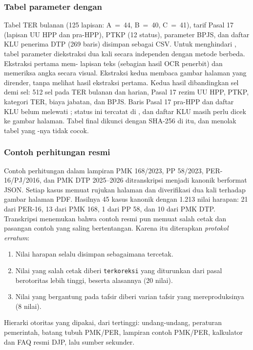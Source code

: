 \subsubsection{Tabel parameter dengan }
Tabel TER bulanan (125 lapisan: A~=~44, B~=~40, C~=~41), tarif Pasal 17 (lapisan UU HPP dan pra-HPP), PTKP (12 status), parameter BPJS, dan daftar KLU penerima DTP (269 baris) disimpan sebagai CSV. Untuk menghindari , tabel parameter diekstraksi dua kali secara independen dengan metode berbeda. Ekstraksi pertama mem- lapisan teks (sebagian hasil OCR penerbit) dan memeriksa angka secara visual. Ekstraksi kedua membaca gambar halaman yang dirender, tanpa melihat hasil ekstraksi pertama. Kedua hasil dibandingkan sel demi sel: 512 sel pada TER bulanan dan harian, Pasal 17 rezim UU HPP, PTKP, kategori TER, biaya jabatan, dan BPJS. Baris Pasal 17 pra-HPP dan daftar KLU belum melewati ; status ini tercatat di , dan daftar KLU masih perlu dicek ke gambar halaman. Tabel final dikunci dengan  SHA-256 di  itu, dan  menolak tabel yang -nya tidak cocok.

\subsubsection{Contoh perhitungan resmi}
Contoh perhitungan dalam lampiran PMK 168/2023, PP 58/2023, PER-16/PJ/2016, dan PMK DTP 2025--2026 ditranskripsi menjadi  kanonik berformat JSON. Setiap kasus memuat rujukan halaman dan diverifikasi dua kali terhadap gambar halaman PDF. Hasilnya 45 kasus kanonik dengan 1.213 nilai harapan: 21 dari PER-16, 13 dari PMK 168, 1 dari PP 58, dan 10 dari PMK DTP. Transkripsi menemukan bahwa contoh resmi pun memuat salah cetak dan pasangan contoh yang saling bertentangan. Karena itu diterapkan \emph{protokol erratum}:
\begin{enumerate}[leftmargin=*,nosep]
  \item Nilai harapan selalu disimpan sebagaimana tercetak.
  \item Nilai yang salah cetak diberi \texttt{terkoreksi} yang diturunkan dari pasal berotoritas lebih tinggi, beserta alasannya (20 nilai).
  \item Nilai yang bergantung pada tafsir diberi varian tafsir yang mereproduksinya (8 nilai).
\end{enumerate}
Hierarki otoritas yang dipakai, dari tertinggi: undang-undang, peraturan pemerintah, batang tubuh PMK/PER, lampiran contoh PMK/PER, kalkulator dan FAQ resmi DJP, lalu sumber sekunder.

